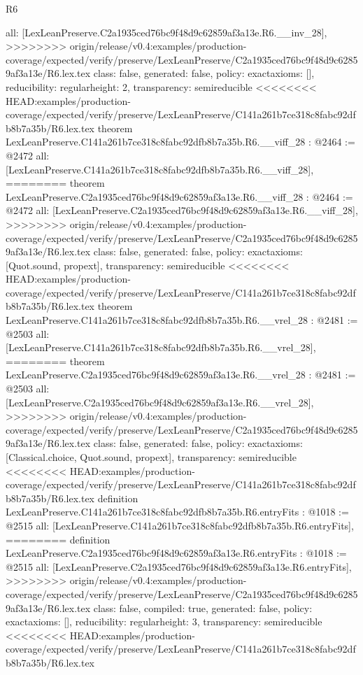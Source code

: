 \begin{lexlean}{R6}
\begin{coremodule}
{{{{{{{{{{{{  all: [LexLeanPreserve.C2a1935ced76bc9f48d9c62859af3a13e.R6.__inv_28],
>>>>>>>> origin/release/v0.4:examples/production-coverage/expected/verify/preserve/LexLeanPreserve/C2a1935ced76bc9f48d9c62859af3a13e/R6.lex.tex
  class: false,
  generated: false,
  policy: exact{axioms: []},
  reducibility: regular{height: 2},
  transparency: semireducible
}
<<<<<<<< HEAD:examples/production-coverage/expected/verify/preserve/LexLeanPreserve/C141a261b7ce318c8fabc92dfb8b7a35b/R6.lex.tex
theorem LexLeanPreserve.C141a261b7ce318c8fabc92dfb8b7a35b.R6.__viff_28 : @2464 := @2472 {
  all: [LexLeanPreserve.C141a261b7ce318c8fabc92dfb8b7a35b.R6.__viff_28],
========
theorem LexLeanPreserve.C2a1935ced76bc9f48d9c62859af3a13e.R6.__viff_28 : @2464 := @2472 {
  all: [LexLeanPreserve.C2a1935ced76bc9f48d9c62859af3a13e.R6.__viff_28],
>>>>>>>> origin/release/v0.4:examples/production-coverage/expected/verify/preserve/LexLeanPreserve/C2a1935ced76bc9f48d9c62859af3a13e/R6.lex.tex
  class: false,
  generated: false,
  policy: exact{axioms: [Quot.sound, propext]},
  transparency: semireducible
}
<<<<<<<< HEAD:examples/production-coverage/expected/verify/preserve/LexLeanPreserve/C141a261b7ce318c8fabc92dfb8b7a35b/R6.lex.tex
theorem LexLeanPreserve.C141a261b7ce318c8fabc92dfb8b7a35b.R6.__vrel_28 : @2481 := @2503 {
  all: [LexLeanPreserve.C141a261b7ce318c8fabc92dfb8b7a35b.R6.__vrel_28],
========
theorem LexLeanPreserve.C2a1935ced76bc9f48d9c62859af3a13e.R6.__vrel_28 : @2481 := @2503 {
  all: [LexLeanPreserve.C2a1935ced76bc9f48d9c62859af3a13e.R6.__vrel_28],
>>>>>>>> origin/release/v0.4:examples/production-coverage/expected/verify/preserve/LexLeanPreserve/C2a1935ced76bc9f48d9c62859af3a13e/R6.lex.tex
  class: false,
  generated: false,
  policy: exact{axioms: [Classical.choice, Quot.sound, propext]},
  transparency: semireducible
}
<<<<<<<< HEAD:examples/production-coverage/expected/verify/preserve/LexLeanPreserve/C141a261b7ce318c8fabc92dfb8b7a35b/R6.lex.tex
definition LexLeanPreserve.C141a261b7ce318c8fabc92dfb8b7a35b.R6.entryFits : @1018 := @2515 {
  all: [LexLeanPreserve.C141a261b7ce318c8fabc92dfb8b7a35b.R6.entryFits],
========
definition LexLeanPreserve.C2a1935ced76bc9f48d9c62859af3a13e.R6.entryFits : @1018 := @2515 {
  all: [LexLeanPreserve.C2a1935ced76bc9f48d9c62859af3a13e.R6.entryFits],
>>>>>>>> origin/release/v0.4:examples/production-coverage/expected/verify/preserve/LexLeanPreserve/C2a1935ced76bc9f48d9c62859af3a13e/R6.lex.tex
  class: false,
  compiled: true,
  generated: false,
  policy: exact{axioms: []},
  reducibility: regular{height: 3},
  transparency: semireducible
}
<<<<<<<< HEAD:examples/production-coverage/expected/verify/preserve/LexLeanPreserve/C141a261b7ce318c8fabc92dfb8b7a35b/R6.lex.tex
}}}}}}}}}}}}}}
\end{coremodule}
\end{lexlean}
